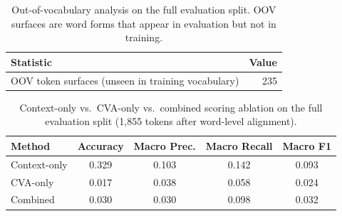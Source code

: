 \begin{table}[ht]
\centering
\caption{Out-of-vocabulary analysis on the full evaluation split.
OOV surfaces are word forms that appear in evaluation but not in training.}
\label{tab:oov}
\begin{tabular}{lr}
\toprule
Statistic & Value \\
\midrule
OOV token surfaces (unseen in training vocabulary) & 235 \\
\bottomrule
\end{tabular}
\end{table}

\begin{table}[ht]
\centering
\caption{Context-only vs.\ CVA-only vs.\ combined scoring ablation
on the full evaluation split (1{,}855 tokens after word-level alignment).}
\label{tab:context_cva_ablation}
\begin{tabular}{lcccc}
\toprule
Method & Accuracy & Macro Prec. & Macro Recall & Macro F1 \\
\midrule
Context-only & 0.329 & 0.103 & 0.142 & 0.093 \\
CVA-only     & 0.017 & 0.038 & 0.058 & 0.024 \\
Combined     & 0.030 & 0.030 & 0.098 & 0.032 \\
\bottomrule
\end{tabular}
\end{table}

